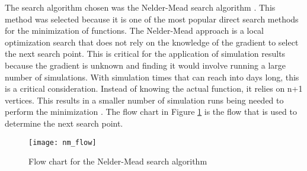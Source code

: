 \label{algrothim_description}

The search algorithm chosen was the Nelder-Mead search algorithm \cite{nelder_1965}.  This method was selected because it is one of the most popular direct search methods for the minimization of functions.  The Nelder-Mead approach is a local optimization search that does not rely on the knowledge of the gradient to select the next search point.  This is critical for the application of simulation results because the gradient is unknown and finding it would involve running a large number of simulations.  With simulation times that can reach into days long, this is a critical consideration.  
Instead of knowing the actual function, it relies on n+1 vertices.  This results in a smaller number of simulation runs being needed to perform the minimization \cite{wang_2011}.
The flow chart in Figure \ref{fig:nm_flow} is the flow that is used to determine the next search point.
\begin{figure}[!htb]
	\centering
	\texttt{[image: nm\_flow]}
	\caption{Flow chart for the Nelder-Mead search algorithm}
	\label{fig:nm_flow}
\end{figure}

